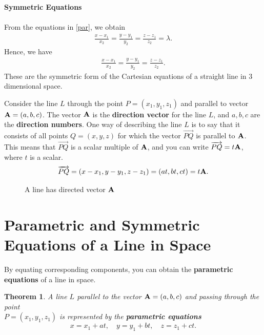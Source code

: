 \documentclass[titlepage,a4paper,12pt]{report}
\newtheorem{theorem}{Theorem}[section]
\begin{document}
\noindent\textbf{Symmetric Equations}\\~\\
From the equations in \eqref{par}, we obtain \begin{eqnarray}
\frac{x-x_1}{x_2}=\frac{y-y_1}{y_2}=\frac{z-z_1}{z_2}=\lambda.\nonumber
\end{eqnarray}Hence, we have \begin{eqnarray}\label{sym}
\frac{x-x_1}{x_2}=\frac{y-y_1}{y_2}=\frac{z-z_1}{z_2}.
\end{eqnarray}These are the symmetric form of the Cartesian equations of a straight line in 3 dimensional space.

\noindent Consider the line $L$ through the point $P=(x_1,y_1,z_1)$ and parallel to vector ${\bf{A}}=(a,b,c)$. The vector ${\bf{A}}$ is the \textbf{direction vector} for the line $L$, and $a,b,c$ are the \textbf{direction numbers}. One way of describing the line $L$ is to say that it consists of all points $Q=(x,y,z)$ for which the vector $\overrightarrow{PQ}$ is parallel to ${\bf{A}}$. This means that $\overrightarrow{PQ}$ is a scalar multiple of ${\bf{A}}$, and you can write $\overrightarrow{PQ}=t{\bf{A}}$, where $t$ is a scalar.
\[\overrightarrow{PQ}=(x-x_1, y-y_1,z-z_1)=(at, bt, ct)=t{\bf{A}}.\]
\begin{figure}[h!]

\caption{A line has directed vector ${\bf{A}}$}
\end{figure}
\section{Parametric and Symmetric Equations of a Line in Space}
By equating corresponding components, you can obtain the \textbf{parametric equations} of a line in space. 
\begin{theorem}
A line $L$ parallel to the vector ${\bf{A}}=(a,b,c)$ and passing through the point\\ $P=(x_1,y_1,z_1)$ is represented by the \textbf{parametric equations}
\[ x=x_1+at, \quad y=y_1+bt, \quad z=z_1+ct. \]
\end{theorem} 
\end{document}
